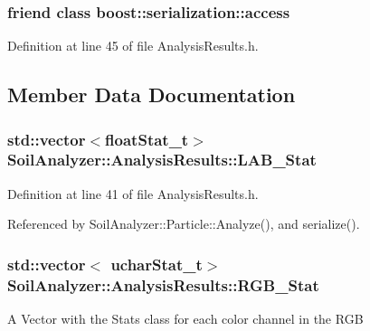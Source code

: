 \subsubsection[{boost\+::serialization\+::access}]{\setlength{\rightskip}{0pt plus 5cm}friend class boost\+::serialization\+::access\hspace{0.3cm}{\ttfamily [friend]}}\label{class_soil_analyzer_1_1_analysis_results_ac98d07dd8f7b70e16ccb9a01abf56b9c}


Definition at line 45 of file Analysis\+Results.\+h.



\subsection{Member Data Documentation}
\hypertarget{class_soil_analyzer_1_1_analysis_results_ae931f7b47ece1f91dc3427520ef4a9b2}{}
\subsubsection[{L\+A\+B\+\_\+\+Stat}]{\setlength{\rightskip}{0pt plus 5cm}std\+::vector$<${\bf float\+Stat\+\_\+t}$>$ Soil\+Analyzer\+::\+Analysis\+Results\+::\+L\+A\+B\+\_\+\+Stat}\label{class_soil_analyzer_1_1_analysis_results_ae931f7b47ece1f91dc3427520ef4a9b2}


Definition at line 41 of file Analysis\+Results.\+h.



Referenced by Soil\+Analyzer\+::\+Particle\+::\+Analyze(), and serialize().

\hypertarget{class_soil_analyzer_1_1_analysis_results_a302530d86430df909abd58164eb0baa8}{}
\subsubsection[{R\+G\+B\+\_\+\+Stat}]{\setlength{\rightskip}{0pt plus 5cm}std\+::vector$<$ {\bf uchar\+Stat\+\_\+t}$>$ Soil\+Analyzer\+::\+Analysis\+Results\+::\+R\+G\+B\+\_\+\+Stat}\label{class_soil_analyzer_1_1_analysis_results_a302530d86430df909abd58164eb0baa8}
A Vector with the Stats class for each color channel in the R\+G\+B 

